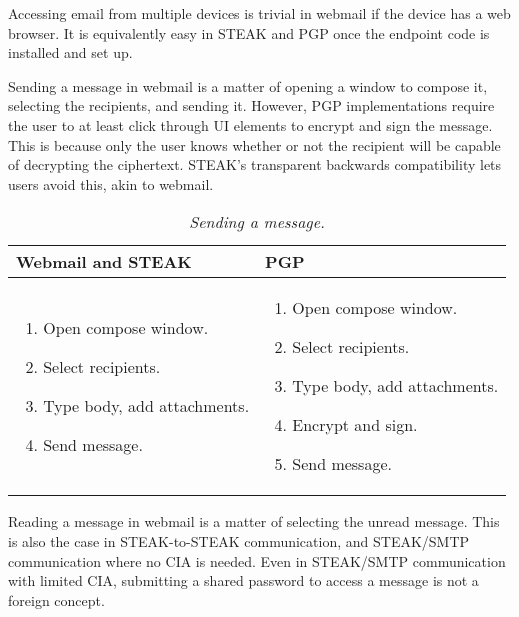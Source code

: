 Accessing email from multiple devices is trivial in webmail if the device has a web browser.  It is equivalently easy in STEAK and PGP once the endpoint code is installed and set up.

Sending a message in webmail is a matter of opening a window to compose it, selecting the recipients, and sending it.  However, PGP implementations require the user to at least click through UI elements to encrypt and sign the message.  This is because only the user knows whether or not the recipient will be capable of decrypting the ciphertext.  STEAK's transparent backwards compatibility lets users avoid this, akin to webmail.

\begin{table}[ht!]
\begin{tabular}{ | L{3.5cm} | L{3.5cm} |}
\hline
\textbf{Webmail and STEAK} & \textbf{PGP} \\
\hline
\vspace{-3mm}
\begin{enumerate}
  \item{Open compose window.}
  \item{Select recipients.} 
  \item{Type body, add attachments.}
  \item{Send message.}
\end{enumerate} 
\vspace{-\topsep} &

\vspace{-3mm}
\begin{enumerate}
  \item{Open compose window.}
  \item{Select recipients.}
  \item{Type body, add attachments.}
  \item{Encrypt and sign.}
  \item{Send message.}
\end{enumerate} 
\vspace{-\topsep} \\

\hline
\end{tabular}
\caption{\it Sending a message.}
\label{tab:account-creation}
\end{table}


Reading a message in webmail is a matter of selecting the unread message.  This is also the case in STEAK-to-STEAK communication, and STEAK/SMTP communication where no CIA is needed.  Even in STEAK/SMTP communication with limited CIA, submitting a shared password to access a message is not a foreign concept.

